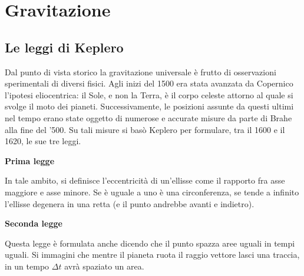 \chapter{Gravitazione}

\section{Le leggi di Keplero}

Dal punto di vista storico la gravitazione universale è frutto di osservazioni sperimentali di diversi fisici. Agli inizi del 1500 era stata avanzata da Copernico l'ipotesi eliocentrica: il Sole, e non la Terra, è il corpo celeste attorno al quale si svolge il moto dei pianeti. Successivamente, le posizioni assunte da questi ultimi nel tempo erano state oggetto di numerose e accurate misure da parte di Brahe alla fine del '500. Su tali misure si basò Keplero per formulare, tra il 1600 e il 1620, le sue tre leggi.

\textbf{Prima legge}

\noindent{}

In tale ambito, si definisce l'eccentricità di un'ellisse come il rapporto fra asse maggiore e asse minore. Se è uguale a uno è una circonferenza, se tende a infinito l'ellisse degenera in una retta (e il punto andrebbe avanti e indietro).

\textbf{Seconda legge} 

\noindent{}

Questa legge è formulata anche dicendo che il punto spazza aree uguali in tempi uguali. Si immagini che mentre il pianeta ruota il raggio vettore lasci una traccia, in un tempo $\Delta t$ avrà spaziato un area.

